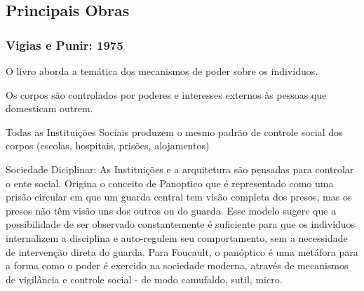 \documentclass{article}
\begin{document}
 \subsection*{Principais Obras}


\subsubsection*{Vigias e Punir: 1975}


O livro aborda a temática dos mecanismos de poder sobre os indivíduos.
\vspace{1mm}

Os corpos são controlados por poderes e interesses externos às pessoas que domesticam outrem.
\vspace{1mm}

Todas as Instituições Sociais produzem o mesmo padrão de controle social dos corpos (escolas, hospitais, prisões, alojamentos)
\vspace{1mm}

Sociedade Diciplinar: As Instituições e a arquitetura são pensadas para controlar o ente social. Origina o conceito de Panoptico que é representado como uma prisão circular em que um guarda central tem visão completa dos presos, mas os presos não têm visão uns dos outros ou do guarda. Esse modelo sugere que a possibilidade de ser observado constantemente é suficiente para que os indivíduos internalizem a disciplina e auto-regulem seu comportamento, sem a necessidade de intervenção direta do guarda. Para Foucault, o panóptico é uma metáfora para a forma como o poder é exercido na sociedade moderna, através de mecanismos de vigilância e controle social - de modo camufaldo, sutil, micro.
\vspace{1mm}
\end{document}
